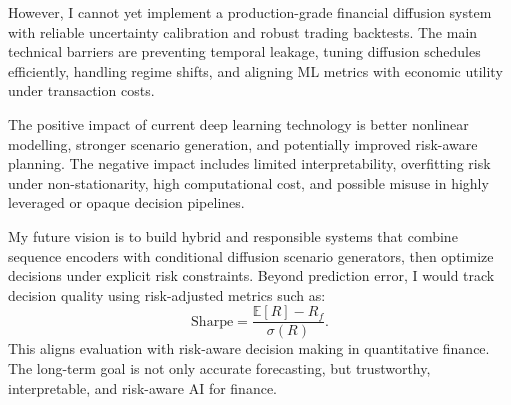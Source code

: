 However, I cannot yet implement a production-grade financial diffusion system with reliable uncertainty calibration and robust trading backtests. The main technical barriers are preventing temporal leakage, tuning diffusion schedules efficiently, handling regime shifts, and aligning ML metrics with economic utility under transaction costs.

The positive impact of current deep learning technology is better nonlinear modelling, stronger scenario generation, and potentially improved risk-aware planning. The negative impact includes limited interpretability, overfitting risk under non-stationarity, high computational cost, and possible misuse in highly leveraged or opaque decision pipelines.

My future vision is to build hybrid and responsible systems that combine sequence encoders with conditional diffusion scenario generators, then optimize decisions under explicit risk constraints. Beyond prediction error, I would track decision quality using risk-adjusted metrics such as:
\[
\mathrm{Sharpe} = \frac{\mathbb{E}[R]-R_f}{\sigma(R)}.
\]
This aligns evaluation with risk-aware decision making in quantitative finance.
The long-term goal is not only accurate forecasting, but trustworthy, interpretable, and risk-aware AI for finance.
